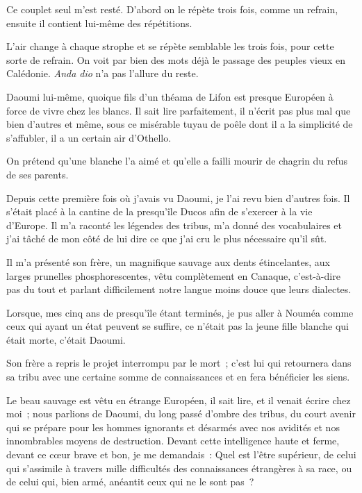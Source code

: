 \documentclass[french,twoside]{book} %
\begin{document}
\noindent Ce couplet seul m’est resté. D’abord on le répète trois fois, comme un refrain, ensuite il contient lui-même des répétitions.\par
L’air change à chaque strophe et se répète semblable les trois fois, pour cette sorte de refrain. On voit par bien des mots déjà le passage des peuples vieux en Calédonie. \emph{Anda dio} n’a pas l’allure du reste.\par
Daoumi lui-même, quoique fils d’un théama de  Lifon est presque Européen à force de vivre chez les blancs. Il sait lire parfaitement, il n’écrit pas plus mal que bien d’autres et même, sous ce misérable tuyau de poêle dont il a la simplicité de s’affubler, il a un certain air d’Othello.\par
On prétend qu’une blanche l’a aimé et qu’elle a failli mourir de chagrin du refus de ses parents.\par
Depuis cette première fois où j’avais vu Daoumi, je l’ai revu bien d’autres fois. Il s’était placé à la cantine de la presqu’île Ducos afin de s’exercer à la vie d’Europe. Il m’a raconté les légendes des tribus, m’a donné des vocabulaires et j’ai tâché de mon côté de lui dire ce que j’ai cru le plus nécessaire qu’il sût.\par
Il m’a présenté son frère, un magnifique sauvage aux dents étincelantes, aux larges prunelles phosphorescentes, vêtu complètement en Canaque, c’est-à-dire pas du tout et parlant difficilement notre langue moins douce que leurs dialectes.\par
Lorsque, mes cinq ans de presqu’île étant terminés, je pus aller à Nouméa comme ceux qui ayant un état peuvent se suffire, ce n’était pas la jeune fille blanche qui était morte, c’était Daoumi.\par
Son frère a repris le projet interrompu par le mort ; c’est lui qui retournera dans sa tribu avec  une certaine somme de connaissances et en fera bénéficier les siens.\par
Le beau sauvage est vêtu en étrange Européen, il sait lire, et il venait écrire chez moi ; nous parlions de Daoumi, du long passé d’ombre des tribus, du court avenir qui se prépare pour les hommes ignorants et désarmés avec nos avidités et nos innombrables moyens de destruction. Devant cette intelligence haute et ferme, devant ce cœur brave et bon, je me demandais : Quel est l’être supérieur, de celui qui s’assimile à travers mille difficultés des connaissances étrangères à sa race, ou de celui qui, bien armé, anéantit ceux qui ne le sont pas ?\par
\end{document}
